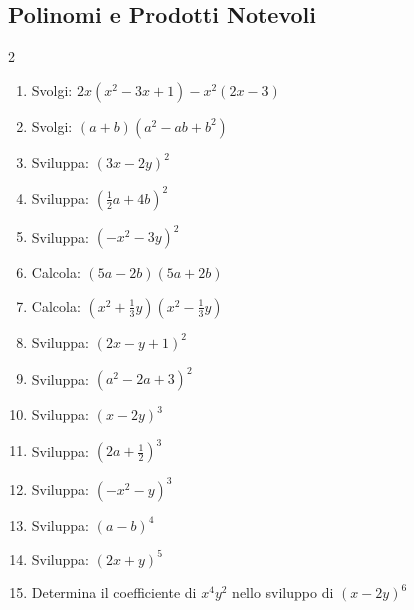 \subsection{Polinomi e Prodotti Notevoli}
\begin{multicols}{2}
\begin{enumerate}
    \item {} Svolgi: $2x(x^2 - 3x + 1) - x^2(2x - 3)$
    \item {} Svolgi: $(a+b)(a^2-ab+b^2)$
    \item {} Sviluppa: $(3x - 2y)^2$
    \item {} Sviluppa: $\left(\frac{1}{2}a + 4b\right)^2$
    \item {} Sviluppa: $(-x^2 - 3y)^2$
    \item {} Calcola: $(5a - 2b)(5a + 2b)$
    \item {} Calcola: $(x^2 + \frac{1}{3}y)(x^2 - \frac{1}{3}y)$
    \item {} Sviluppa: $(2x - y + 1)^2$
    \item {} Sviluppa: $(a^2 - 2a + 3)^2$
    \item {} Sviluppa: $(x - 2y)^3$
    \item {} Sviluppa: $\left(2a + \frac{1}{2}\right)^3$
    \item {} Sviluppa: $(-x^2 - y)^3$
    \item {} Sviluppa: $(a - b)^4$
    \item {} Sviluppa: $(2x + y)^5$
    \item {} Determina il coefficiente di $x^4y^2$ nello sviluppo di $(x - 2y)^6$
\end{enumerate}
\end{multicols}

